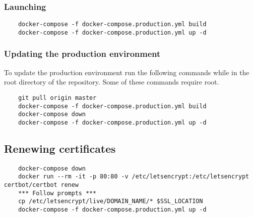 \subsubsection{Launching}

\begin{verbatim}
	docker-compose -f docker-compose.production.yml build
	docker-compose -f docker-compose.production.yml up -d
\end{verbatim}

\subsubsection{Updating the production environment}

To update the production environment run the following commands while in the root directory of the repository.  Some of these commands require root.

\begin{verbatim}
	git pull origin master
	docker-compose -f docker-compose.production.yml build
	docker-compose down
	docker-compose -f docker-compose.production.yml up -d
\end{verbatim}

\subsection{Renewing certificates} \label{section:certificate-renewal}

\begin{verbatim}
	docker-compose down
	docker run --rm -it -p 80:80 -v /etc/letsencrypt:/etc/letsencrypt certbot/certbot renew
	*** Follow prompts ***
	cp /etc/letsencrypt/live/DOMAIN_NAME/* $SSL_LOCATION
	docker-compose -f docker-compose.production.yml up -d
\end{verbatim}
